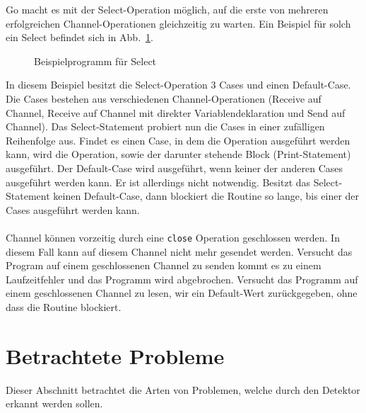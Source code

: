 Go macht es mit der Select-Operation möglich, auf die erste von mehreren 
erfolgreichen Channel-Operationen gleichzeitig zu warten. Ein Beispiel für solch 
ein Select befindet sich in Abb.~\ref{Chan:Analyze-Sec:Channel-Fig:SelectEx}.
\begin{figure}[h!]
  
  \caption{Beispielprogramm für Select}
  \label{Chan:Analyze-Sec:Channel-Fig:SelectEx}
\end{figure}
In diesem Beispiel besitzt die Select-Operation 3 Cases und einen Default-Case.
Die Cases bestehen aus verschiedenen Channel-Operationen (Receive auf Channel, 
Receive auf Channel mit direkter Variablendeklaration und Send auf Channel).
Das Select-Statement probiert nun die Cases in einer zufälligen Reihenfolge 
aus. Findet es einen Case, in dem die Operation ausgeführt werden kann, wird 
die Operation, sowie der darunter stehende Block (Print-Statement) ausgeführt.
Der Default-Case wird ausgeführt, wenn keiner der anderen Cases ausgeführt 
werden kann. Er ist allerdings nicht notwendig. Besitzt das Select-Statement 
keinen Default-Case, dann blockiert die Routine so lange, bis einer der Cases 
ausgeführt werden kann.\\\\
Channel können vorzeitig durch eine \texttt{close} Operation geschlossen werden.
In diesem Fall kann auf diesem Channel nicht mehr gesendet werden. Versucht 
das Program auf einem geschlossenen Channel zu senden kommt es zu einem 
Laufzeitfehler und das Programm wird abgebrochen. Versucht das Programm 
auf einem geschlossenen Channel zu lesen, wir ein Default-Wert zurückgegeben,
ohne dass die Routine blockiert.

\section{Betrachtete Probleme}\label{chap:background-sec:Prob}
Dieser Abschnitt betrachtet die Arten von Problemen, welche durch den Detektor 
erkannt werden sollen. 

